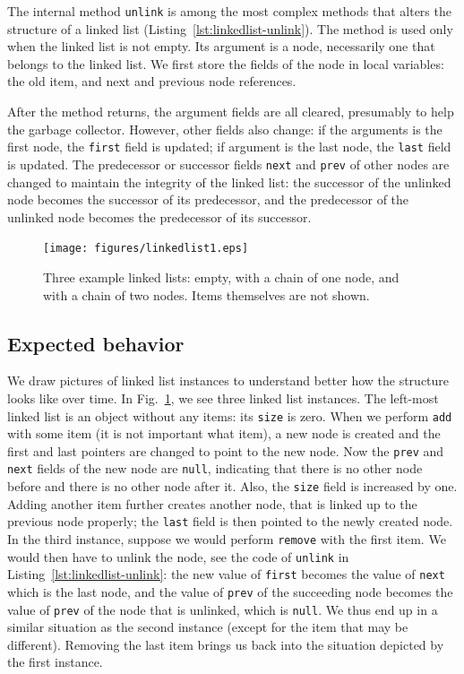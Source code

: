 \documentclass[runningheads]{llncs}
\begin{document}


The internal method \texttt{unlink} is among the most complex methods that alters the structure of a linked list (Listing~\ref{lst:linkedlist-unlink}). The method is used only when the linked list is not empty. Its argument is a node, necessarily one that belongs to the linked list. We first store the fields of the node in local variables: the old item, and next and previous node references.

After the method returns, the argument fields are all cleared, presumably to help the garbage collector. However, other fields also change: if the arguments is the first node, the \texttt{first} field is updated; if argument is the last node, the \texttt{last} field is updated. The predecessor or successor fields \texttt{next} and \texttt{prev} of other nodes are changed to maintain the integrity of the linked list: the successor of the unlinked node becomes the successor of its predecessor, and the predecessor of the unlinked node becomes the predecessor of its successor.

\begin{figure}
  \centering
  \texttt{[image: figures/linkedlist1.eps]}
  \caption{Three example linked lists: empty, with a chain of one node, and with a chain of two nodes. Items themselves are not shown.}
  \label{fig:linkedlist}
\end{figure}

\subsection{Expected behavior}

We draw pictures of linked list instances to understand better how the structure looks like over time. In Fig.~\ref{fig:linkedlist}, we see three linked list instances. The left-most linked list is an object without any items: its \texttt{size} is zero. When we perform \texttt{add} with some item (it is not important what item), a new node is created and the first and last pointers are changed to point to the new node. Now the \texttt{prev} and \texttt{next} fields of the new node are \texttt{null}, indicating that there is no other node before and there is no other node after it. Also, the \texttt{size} field is increased by one. Adding another item further creates another node, that is linked up to the previous node properly; the \texttt{last} field is then pointed to the newly created node.
In the third instance, suppose we would perform \texttt{remove} with the first item. We would then have to unlink the node, see the code of \texttt{unlink} in Listing~\ref{lst:linkedlist-unlink}: the new value of \texttt{first} becomes the value of \texttt{next} which is the last node, and the value of \texttt{prev} of the succeeding node becomes the value of \texttt{prev} of the node that is unlinked, which is \texttt{null}. We thus end up in a similar situation as the second instance (except for the item that may be different). Removing the last item brings us back into the situation depicted by the first instance.
\end{document}
